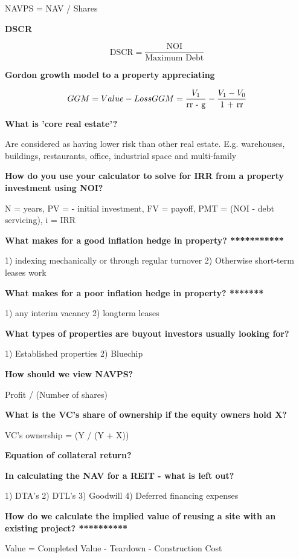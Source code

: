 \documentclass[12pt]{article}
\begin{document}
\begin{framed}
NAVPS = NAV / Shares

\textbf{DSCR}

$$
\text{DSCR} = \dfrac{\text{NOI}}{\text{Maximum Debt}}
$$

\textbf{Gordon growth model to a property appreciating}

\begin{equation}
GGM = Value - Loss \\
GGM = \dfrac{V_1}{\text{rr - g}} -  \dfrac{V_1 - V_0}{\text{1 + rr}}
\end{equation}

\textbf{What is 'core real estate'?}

Are considered as having lower risk than other real estate. E.g. warehouses, buildings, restaurants, office, industrial space and multi-family

\textbf{How do you use your calculator to solve for IRR from a property investment using NOI?}

N = years, PV = - initial investment, FV = payoff, PMT = (NOI - debt servicing), i = IRR

\textbf{What makes for a good inflation hedge in property? ***********}

1) indexing mechanically or through regular turnover
2) Otherwise short-term leases work

\textbf{What makes for a poor inflation hedge in property? *******}

1) any interim vacancy
2) longterm leases


\textbf{What types of properties are buyout investors usually looking for?}

1) Established properties
2) Bluechip

\textbf{How should we view NAVPS?}

Profit / (Number of shares)

\textbf{What is the VC's share of ownership if the equity owners hold X?}

VC's ownership = (Y / (Y + X))

\textbf{Equation of collateral return?}

\textbf{In calculating the NAV for a REIT - what is left out?}

1) DTA's
2) DTL's
3) Goodwill
4) Deferred financing expenses

\textbf{How do we calculate the implied value of reusing a site with an existing project?  **********}

Value = Completed Value - Teardown - Construction Cost


\end{framed}
\end{document}

